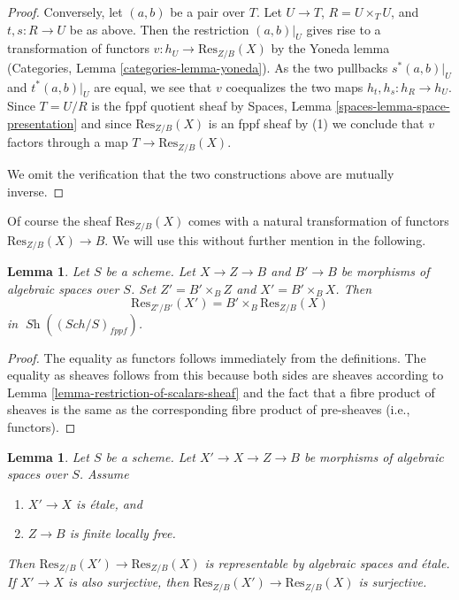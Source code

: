\documentclass{stacks-project}
\theoremstyle{plain}
\newtheorem{lemma}[subsection]{Lemma}
\theoremstyle{definition}
\theoremstyle{remark}
\numberwithin{equation}{subsection}
\def\Sch{\mathit{Sch}}
\def\Sh{\mathop{\mathit{Sh}}\nolimits}
\begin{document}
\begin{proof}
\medskip\noindent
Conversely, let $(a, b)$ be a pair over $T$.
Let $U \to T$, $R = U \times_T U$, and $t, s : R \to U$ be as
above. Then the restriction $(a, b)|_U$ gives rise to a
transformation of functors $v : h_U \to \text{Res}_{Z/B}(X)$ by the
Yoneda lemma
(Categories, Lemma \ref{categories-lemma-yoneda}).
As the two pullbacks $s^*(a, b)|_U$ and $t^*(a, b)|_U$
are equal, we see that $v$ coequalizes the two maps
$h_t, h_s : h_R \to h_U$. Since $T = U/R$ is the fppf quotient sheaf by
Spaces, Lemma \ref{spaces-lemma-space-presentation}
and since $\text{Res}_{Z/B}(X)$ is an fppf sheaf by (1) we conclude
that $v$ factors through a map $T \to \text{Res}_{Z/B}(X)$.

\medskip\noindent
We omit the verification that the two constructions above are mutually
inverse.
\end{proof}

\noindent
Of course the sheaf $\text{Res}_{Z/B}(X)$ comes with a natural transformation
of functors $\text{Res}_{Z/B}(X) \to B$. We will use this without further
mention in the following.

\begin{lemma}
\label{lemma-etale-base-change-restriction-of-scalars}
Let $S$ be a scheme. Let $X \to Z \to B$ and $B' \to B$
be morphisms of algebraic spaces over $S$.
Set $Z' = B' \times_B Z$ and $X' = B' \times_B X$. Then
$$
\text{Res}_{Z'/B'}(X')
=
B' \times_B \text{Res}_{Z/B}(X)
$$
in $\Sh((\Sch/S)_{fppf})$.
\end{lemma}

\begin{proof}
The equality as functors follows immediately from the definitions.
The equality as sheaves follows from this because both sides are
sheaves according to
Lemma \ref{lemma-restriction-of-scalars-sheaf}
and the fact that a fibre product of sheaves is the same as the
corresponding fibre product of pre-sheaves (i.e., functors).
\end{proof}

\begin{lemma}
\label{lemma-etale-covering-restriction-of-scalars}
Let $S$ be a scheme. Let $X' \to X \to Z \to B$ be morphisms of
algebraic spaces over $S$. Assume
\begin{enumerate}
\item $X' \to X$ is \'etale, and
\item $Z \to B$ is finite locally free.
\end{enumerate}
Then $\text{Res}_{Z/B}(X') \to \text{Res}_{Z/B}(X)$ is representable
by algebraic spaces and \'etale. If $X' \to X$ is also surjective,
then $\text{Res}_{Z/B}(X') \to \text{Res}_{Z/B}(X)$ is surjective.
\end{lemma}
\end{document}
